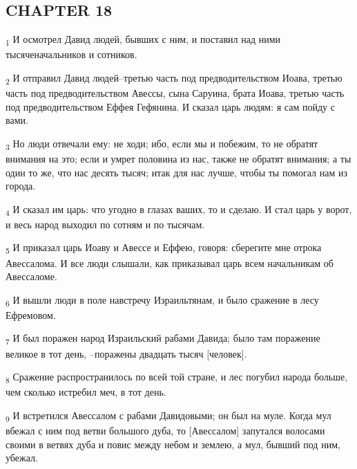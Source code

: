 \subsection{CHAPTER 18}
\begin{tcolorbox}
\textsubscript{1} И осмотрел Давид людей, бывших с ним, и поставил над ними тысяченачальников и сотников.
\end{tcolorbox}
\begin{tcolorbox}
\textsubscript{2} И отправил Давид людей--третью часть под предводительством Иоава, третью часть под предводительством Авессы, сына Саруина, брата Иоава, третью часть под предводительством Еффея Гефянина. И сказал царь людям: я сам пойду с вами.
\end{tcolorbox}
\begin{tcolorbox}
\textsubscript{3} Но люди отвечали ему: не ходи; ибо, если мы и побежим, то не обратят внимания на это; если и умрет половина из нас, также не обратят внимания; а ты один то же, что нас десять тысяч; итак для нас лучше, чтобы ты помогал нам из города.
\end{tcolorbox}
\begin{tcolorbox}
\textsubscript{4} И сказал им царь: что угодно в глазах ваших, то и сделаю. И стал царь у ворот, и весь народ выходил по сотням и по тысячам.
\end{tcolorbox}
\begin{tcolorbox}
\textsubscript{5} И приказал царь Иоаву и Авессе и Еффею, говоря: сберегите мне отрока Авессалома. И все люди слышали, как приказывал царь всем начальникам об Авессаломе.
\end{tcolorbox}
\begin{tcolorbox}
\textsubscript{6} И вышли люди в поле навстречу Израильтянам, и было сражение в лесу Ефремовом.
\end{tcolorbox}
\begin{tcolorbox}
\textsubscript{7} И был поражен народ Израильский рабами Давида; было там поражение великое в тот день, --поражены двадцать тысяч [человек].
\end{tcolorbox}
\begin{tcolorbox}
\textsubscript{8} Сражение распространилось по всей той стране, и лес погубил народа больше, чем сколько истребил меч, в тот день.
\end{tcolorbox}
\begin{tcolorbox}
\textsubscript{9} И встретился Авессалом с рабами Давидовыми; он был на муле. Когда мул вбежал с ним под ветви большого дуба, то [Авессалом] запутался волосами своими в ветвях дуба и повис между небом и землею, а мул, бывший под ним, убежал.
\end{tcolorbox}
